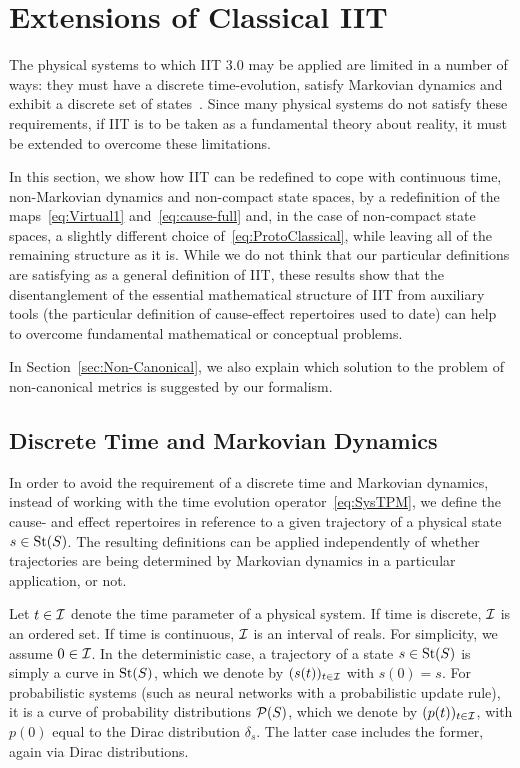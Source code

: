 \section{Extensions of Classical IIT} \label{sec:problems}

The physical systems to which IIT 3.0 may be applied are limited in a number of ways: they must have a discrete time-evolution, satisfy Markovian dynamics and exhibit a discrete set of states~\cite{BarrettMediano.2019}. Since many physical systems do not satisfy these requirements, if IIT is to be taken as a fundamental theory about reality, it must be extended to overcome these limitations. 

In this section, we show how 
IIT can be redefined to cope with continuous time, non-Markovian dynamics and non-compact state spaces, by a redefinition of the maps~\eqref{eq:Virtual1} and~\eqref{eq:cause-full} and, in the case of non-compact state spaces, a slightly different choice of~\eqref{eq:ProtoClassical}, while leaving all of the remaining structure as it is. While we do not think that our particular definitions are satisfying as a general definition of IIT, these results show that the disentanglement of the essential mathematical structure of IIT from auxiliary tools (the particular definition of cause-effect repertoires used to date) can help to overcome fundamental mathematical or conceptual problems.

In Section~\ref{sec:Non-Canonical}, we also explain which solution to the problem of non-canonical metrics is suggested by our formalism. 

\subsection{Discrete Time and Markovian Dynamics}\label{sec:PTimeM}
In order to avoid the requirement of a discrete time and Markovian dynamics, instead of working with the time evolution
operator~\eqref{eq:SysTPM}, 
we define the cause- and effect repertoires in reference to a given trajectory of a physical state $s \in \text{St}(S)$. 
The resulting definitions can be applied independently of whether trajectories are being determined by Markovian dynamics in a particular application, or not.\medskip

Let $t\in{\mathcal{I}}$ denote the time parameter of a physical system. If time is discrete, ${\mathcal{I}}$ is an ordered set. If time is continuous, ${\mathcal{I}}$ is an interval of reals. For simplicity, we assume $0 \in {\mathcal{I}}$. In the deterministic case, a trajectory of a state $s \in \text{St}(S)$ is simply a curve in $\text{St}(S)$, which we denote by $(s(t))_{t \in {\mathcal{I}}}$ with $s(0) = s$. 
For probabilistic systems (such as neural networks with a probabilistic update rule), it is a curve of probability distributions $\mathcal P(S)$, which we denote by $(p(t))_{t\in{\mathcal{I}}}$, with $p(0)$ equal to the Dirac distribution $\delta_s$. The latter case includes the former, again via Dirac distributions.

